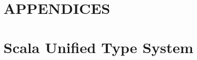 \documentclass[letterpaper,12pt,titlepage,oneside,final]{book}
\let\origdoublepage\cleardoublepage
\newcommand{\clearemptydoublepage}{%
  \clearpage{\pagestyle{empty}\origdoublepage}}
\let\cleardoublepage\clearemptydoublepage
\begin{document}

\cleardoublepage %
\renewcommand*{\bibname}{References}




\nocite{*}

\appendix
\chapter*{APPENDICES}

\chapter{Scala Unified Type System}

\end{document}
